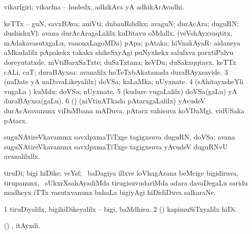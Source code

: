 {{{{{\bentry
{}
\gl{\nA}
\expl{}
\bmng
\emng
\eentry

\bentry
{} 
\gl{\nA}
\expl{}
\bmng
 vikarfgiri; vikarfna -- hudedx, adhikAra yA adhikArAvadhi. 
\emng
\eentry

\bentry
{} 
\gl{\nA}
\expl{}
\bmng
\bnum
{} 
\banum
{} keTTx -- guN, savxBAva; aniVti; dubauRdidhx; avaguN; durAcAra; duguRN; dushishxVl:  avana durAcAragaLalilx kuDitavu oMdallx. 
 (veVshAyxvaqtitx, mAdakavasutxgaLu, \mo vanonxLagoMDa) pApa; pAtaka; hiVnakAyaR:  aidaneya aMkadalilx pApakekx takakx shikeSxyAgi puNyxkekx salulxva parxtiPalvu doreyutatxde. 
\eanum
\numie
{} 
\banum
{} niVtiBarxSaTxte; duSaTxtana; keVDu; duSakxqqtayx. 
 keTTx cALi, caT; duraBAyxsa:  avanalilx hoTeTxbAkatanada duraBAyxsavide. 
\eanum
\numie
\num{3} (naDate yA naDavaLikeyalilx) doVSa; kaLaMka; nUyxnate. 
\num{4} (sAhitayxsheYli \mo vugaLa \vi) kuMdu; doVSa; nUyxnate. 
\num{5} (kudure \mo vugaLalilx) doVSa(gaLu) yA duraBAyxsa(gaLu). 
\num{6} (\ca) (niVtinATkada pAtarxgaLalilx) yAvudeV durAcAravanunx viDaMbana mADuva, pAtarx vahisuva koVDaMgi, vidUSaka pAtarx. 
\enum
\emng

\noindent 
\gl{\pagu}
\expl{}
\bmng
  suguNAtireVkavanunx savxlpxmaTiTxge tagigxsuva duguRN, doVSa:  avana suguNAtireVkavanunx savxlpxmaTiTxge tagigxsuva yAvudeV duguRNvU avanalilxllx. 
\emng
\eentry

\bentry 
{} 
\gl{\nA}
\expl{}
\bmng
 tiruDi; bigi hiDike; veYsf; \kanmu\ baDagiya illxve loVhagArana beMcige bigidiruva, tirupanunx, \kanmu\ sUkxrXsahAyadiMda tirugisuvudariMda adara davaDegaLu saridu madheyx iTTx vasutxvanunx bahaLa bigiyAgi hiDidiDuva salkaraNe. 
\emng
\eentry

\bentry
{} 
\gl{\sakirx}
\expl{}
\bmng
\bnum
\num{1} tiruDiyalilx, bigihiDikeyalilx -- bigi, baMdhisu. 
\num{2} (\rUpa) kapimuSiTxyalilx hiDi. 
\enum
\emng
\eentry

\bentry
{} 
\gl{\nA}
\expl{}
\bmng
 (\AmA) , itAyxdi. 
\emng
\eentry

}}}}}
